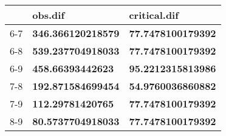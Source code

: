 \begin{table}[ht]
\centering
\begin{tabular}{rll}
  \hline
 & obs.dif & critical.dif \\ 
  \hline
6-7 & \textbf{346.366120218579} & \textbf{77.7478100179392} \\ 
  6-8 & \textbf{539.237704918033} & \textbf{77.7478100179392} \\ 
  6-9 & \textbf{458.66393442623} & \textbf{95.2212315813986} \\ 
  7-8 & \textbf{192.871584699454} & \textbf{54.9760036860882} \\ 
  7-9 & \textbf{112.29781420765} & \textbf{77.7478100179392} \\ 
  8-9 & \textbf{80.5737704918033} & \textbf{77.7478100179392} \\ 
   \hline
\end{tabular}
\end{table}
